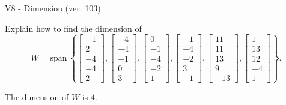 \begin{exercise}
  \begin{exerciseTitle}V8 - Dimension (ver. 103)\end{exerciseTitle}
  \begin{exerciseStatement}
    Explain how to find the dimension of 
\[W=\mathrm{span}\ \left\{\left[\begin{array}{r}
-1 \\
2 \\
-4 \\
-4 \\
2
\end{array}\right] , \left[\begin{array}{r}
-4 \\
-4 \\
-1 \\
0 \\
3
\end{array}\right] , \left[\begin{array}{r}
0 \\
-1 \\
-4 \\
-2 \\
1
\end{array}\right] , \left[\begin{array}{r}
-1 \\
-4 \\
-2 \\
3 \\
-1
\end{array}\right] , \left[\begin{array}{r}
11 \\
11 \\
13 \\
9 \\
-13
\end{array}\right] , \left[\begin{array}{r}
1 \\
13 \\
12 \\
-4 \\
1
\end{array}\right]\right\}.\]



  \end{exerciseStatement}
  \begin{exerciseAnswer}
   The dimension of \(W\) is  \(4\).
  


  \end{exerciseAnswer}
\end{exercise}